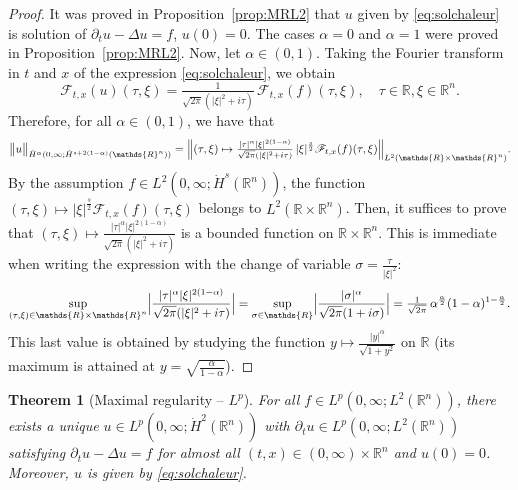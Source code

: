 \documentclass[a4paper, 12pt]{article}
\theoremstyle{plain}
\newtheorem{theorem}[proposition]{Theorem}
\theoremstyle{definition}
\theoremstyle{remark}
\numberwithin{equation}{section}
\begin{document}
\begin{proof}
It was proved in Proposition~\ref{prop:MRL2} that $u$ given by \eqref{eq:solchaleur} is solution of $\partial_tu-\Delta u=f$, $u(0)=0$.
The cases $\alpha=0$ and $\alpha =1$ were proved in Proposition~\ref{prop:MRL2}. Now, let $\alpha\in(0,1)$. Taking the Fourier
transform in $t$ and $x$ of the expression \eqref{eq:solchaleur}, we obtain
\[
{\mathscr{F}}_{t,x}(u)(\tau,\xi)=\tfrac{1}{\sqrt{2\pi}(|\xi|^2+i\tau)}\,{\mathscr{F}}_{t,x}(f)(\tau,\xi), \quad \tau\in{\mathds{R}}, \xi \in {\mathds{R}}^n.
\]
Therefore, for all $\alpha\in(0,1)$, we have that
\[
\bigl\|u\bigr\|_{\dot H^\alpha(0,\infty;\dot H^{s+2(1-\alpha)}({\mathds{R}}^n))}
=\Bigl\|(\tau,\xi)\mapsto \tfrac{|\tau|^\alpha|\xi|^{2(1-\alpha)}}{\sqrt{2\pi}(|\xi|^2+i\tau)}\,
|\xi|^{\frac{s}{2}}{\mathscr{F}}_{t,x}(f)(\tau,\xi)\Bigr\|_{L^2({\mathds{R}}\times{\mathds{R}}^n)}.
\]
By the assumption $f\in L^2(0,\infty; \dot H^s({\mathds{R}}^n))$, the function $(\tau,\xi)\mapsto |\xi|^{\frac{s}{2}}{\mathscr{F}}_{t,x}(f)(\tau,\xi)$
belongs to $L^2({\mathds{R}}\times{\mathds{R}}^n)$. Then, it suffices to prove that
$(\tau,\xi)\mapsto \frac{|\tau|^\alpha|\xi|^{2(1-\alpha)}}{\sqrt{2\pi}(|\xi|^2+i\tau)}$ is a bounded function on ${\mathds{R}}\times{\mathds{R}}^n$.
This is immediate when writing the expression with the change of variable $\sigma=\frac{\tau}{|\xi|^2}$:
\[
\sup_{(\tau,\xi)\in{\mathds{R}}\times{\mathds{R}}^n}\Bigl|\frac{|\tau|^\alpha|\xi|^{2(1-\alpha)}}{\sqrt{2\pi}(|\xi|^2+i\tau)}\Bigr|
=\sup_{\sigma\in{\mathds{R}}}\Bigl|\frac{|\sigma|^\alpha}{\sqrt{2\pi}(1+i\sigma)}\Bigr| 
=\tfrac{1}{\sqrt{2\pi}}\,\alpha^{\frac{\alpha}{2}}(1-\alpha)^{1-\frac{\alpha}{2}}.
\]
This last value is obtained by studying the function $y\mapsto \frac{|y|^\alpha}{\sqrt{1+y^2}}$ on ${\mathds{R}}$ (its maximum is attained
at $y=\sqrt{\frac{\alpha}{1-\alpha}}$).
\end{proof}

\begin{theorem}[Maximal regularity -- $L^p$]
\label{thm:MRLp}
For all $f\in L^p(0,\infty; L^2({\mathds{R}}^n))$, there exists a unique $u\in L^p(0,\infty; \dot H^2({\mathds{R}}^n))$ with
$\partial_t u\in L^p(0,\infty; L^2({\mathds{R}}^n))$ satisfying $\partial_t u-\Delta u=f$ for almost all $(t,x)\in (0,\infty)\times{\mathds{R}}^n$
and $u(0)=0$. Moreover, $u$ is given by \eqref{eq:solchaleur}.
\end{theorem}
\end{document}
